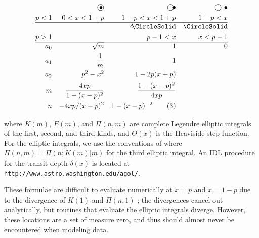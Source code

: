 \documentclass[manuscript]{aastex}
\begin{document}
\begin{align*}
&& \ooalign{$\bigcirc$\cr\kern+3pt$\bullet$} && \ooalign{$\bigcirc$\cr\kern+7.5pt$\bullet$}  && \bigcirc ~ \bullet \\
p < 1&&0 < x < 1-p & & 1 - p < x < 1+p  & & 1+p < x \\
\hline
&&  && \ooalign{$\circ$\cr\kern+2pt\CircleSolid}  && \ooalign{\CircleSolid} \\
p > 1 && && p - 1 < x&& x < p - 1\\
\hline
a_0 && \sqrt{m} && 1 && 0\\
a_1 && \frac{1}{m} && 1 && \\
a_2 && p^2-x^2 && 1-2p(x+p) && \\
m && 4xp\over 1-(x-p)^2 && \frac{1-(x-p)^2}{4xp} && \label{defs} \\ 
n && -4xp/(x-p)^2 && 1-(x-p)^{-2} \tag{3} &&
\end{align*}



where $K(m)$, $E(m)$, and $\Pi(n,m)$ are complete Legendre elliptic 
integrals of the first, second, and third kinds, and $\Theta(x)$ is
the Heaviside step function. For the elliptic integrals, we use the conventions of \citet{handbk} where $\Pi(n,m) = \Pi(n;K(m)|m)$ for the third elliptic integral. An IDL procedure for the transit depth $\delta (x)$ is located at \texttt{http://www.astro.washington.edu/agol/}.

These formulae are difficult to evaluate numerically at 
$x=p$ and $x=1-p$ due to the divergence of $K(1)$ and $\Pi(n,1)$
; the divergences cancel out analytically, but routines that
evaluate the elliptic integrals diverge.  However, these locations
are a set of measure zero, and thus should almost never be encountered
when modeling data. 
\end{document}
